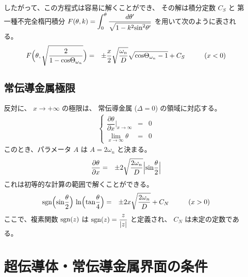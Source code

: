 \documentclass[uplatex,a4j,12pt,dvipdfmx]{jsarticle}
\begin{document}
したがって、この方程式は容易に解くことができ、
その解は積分定数 $C_{S}$ と
第一種不完全楕円積分
$\displaystyle F(\theta,k) = \int^{\theta}_{0} \dfrac{d \theta'}{ \sqrt{1 - k^{2} {\rm sin}^{2} \theta'}}$
を用いて次のように表される。
\begin{eqnarray}
	F \Big(\theta,\sqrt{ \dfrac{2}{ 1 - {\rm cos} \Theta_{\omega_{n}} } } \Big)
	&=&
	\pm
	\dfrac{x}{2}
	\sqrt{ \dfrac{ \omega_{n} }{ D } }
	\sqrt{ {\rm cos} \Theta_{\omega_{n}} - 1 }
	+
	C_{S}
	\hspace{10mm}
	(x<0)
\end{eqnarray}

\subsection{常伝導金属極限}

反対に、
$x \to + \infty$ の極限は、
常伝導金属 ($\Delta=0$) の領域に対応する。
\begin{eqnarray}
	\left\{
	\begin{array}{rcl}
		\dfrac{\partial \theta}{\partial x} \Big|_{x \to \infty}
		 & = & 0
		\\[4mm]
		\displaystyle \lim_{x \to \infty} \theta
		 & = &
		0
	\end{array}
	\right.
\end{eqnarray}
このとき、パラメータ $A$ は $A=2 \omega_{n}$ と決まる。
\begin{eqnarray}
	\dfrac{\partial \theta}{\partial x}
	&=&
	\pm
	2 \sqrt{ \dfrac{2 \omega_{n}}{D} } \Big| {\rm sin} \dfrac{\theta}{2} \Big|
\end{eqnarray}
これは初等的な計算の範囲で解くことができる。
\begin{eqnarray}
	{\rm sgn} \Big( {\rm sin} \dfrac{\theta}{2} \Big)
	\
	{\rm ln} \Big( {\rm tan} \dfrac{\theta}{4} \Big)
	&=&
	\pm
	2 x \sqrt{ \dfrac{2 \omega_{n}}{D} }
	+
	C_{N}
	\hspace{10mm}
	(x>0)
\end{eqnarray}
ここで、複素関数 ${\rm sgn}(z)$ は ${\rm sgn}(z) = \dfrac{z}{|z|}$ と定義され、
$C_{N}$ は未定の定数である。
\section{超伝導体・常伝導金属界面の条件}
\end{document}
